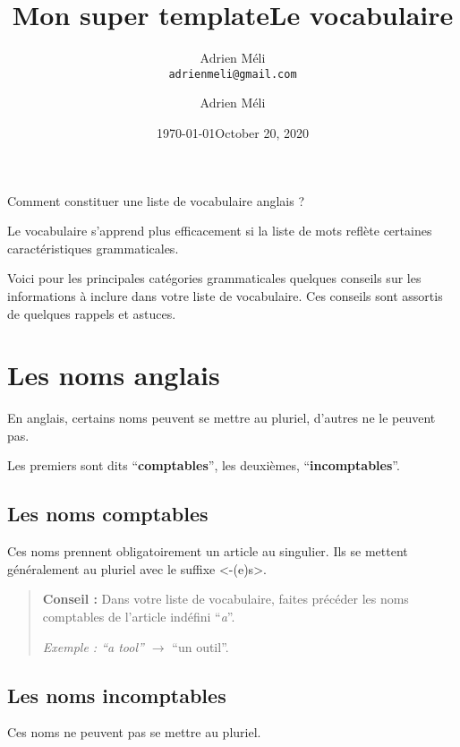 \documentclass[
  10pt,
]{article}
\title{Mon super template}
\author{Adrien M\'{e}li\\{\tt adrienmeli@gmail.com}}
\date{\today}
\title{Le vocabulaire}
\author{Adrien Méli}
\date{October 20, 2020}
\begin{document}
\maketitle

\pagestyle{fancy}

Comment constituer une liste de vocabulaire anglais ?

Le vocabulaire s'apprend plus efficacement si la liste de mots reflète certaines caractéristiques grammaticales.

Voici pour les principales catégories grammaticales quelques conseils sur les informations à inclure dans votre liste de vocabulaire.
Ces conseils sont assortis de quelques rappels et astuces.

\hypertarget{les-noms-anglais}{%
\section{Les noms anglais}\label{les-noms-anglais}}

En anglais, certains noms peuvent se mettre au pluriel, d'autres ne le peuvent pas.

Les premiers sont dits ``\textbf{comptables}'', les deuxièmes, ``\textbf{incomptables}''.

\hypertarget{les-noms-comptables}{%
\subsection{Les noms comptables}\label{les-noms-comptables}}

Ces noms prennent obligatoirement un article au singulier.
Ils se mettent généralement au pluriel avec le suffixe \textless-(e)s\textgreater.

\begin{quote}
\textbf{Conseil :} Dans votre liste de vocabulaire, faites précéder les noms comptables de l'article indéfini ``\emph{a}''.

\emph{Exemple : ``a tool'' \(\rightarrow\)} ``un outil''.
\end{quote}

\hypertarget{les-noms-incomptables}{%
\subsection{Les noms incomptables}\label{les-noms-incomptables}}

Ces noms ne peuvent pas se mettre au pluriel.
\end{document}

